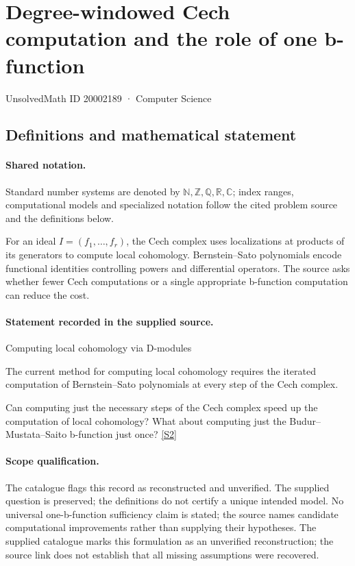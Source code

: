 \documentclass[11pt]{article}
\newcommand{\sref}[2]{\hyperlink{source:#1:#2}{[S#2]}}
\begin{document}
\setcounter{section}{20002188}
\section{Degree-windowed Cech computation and the role of one b-function}\label{20002189}
{\small\sffamily UnsolvedMath ID 20002189 · Computer Science}
\subsection{Definitions and mathematical statement}

\paragraph{Shared notation.}Standard number systems are denoted by $\mathbb N,\mathbb Z,\mathbb Q,\mathbb R,\mathbb C$; index ranges, computational models and specialized notation follow the cited problem source and the definitions below.


For an ideal $I=(f_1,\ldots,f_r)$, the Cech complex uses localizations at products of its generators to compute local cohomology. Bernstein--Sato polynomials encode functional identities controlling powers and differential operators. The source asks whether fewer Cech computations or a single appropriate b-function computation can reduce the cost.
\paragraph{Statement recorded in the supplied source.}
Computing local cohomology via D-modules

The current method for computing local cohomology requires the iterated computation of Bernstein--Sato polynomials at every step of the Cech complex.

Can computing just the necessary steps of the Cech complex speed up the computation of local cohomology? What about computing just the Budur--Mustata--Saito b-function just once? \sref{20002189}{2}
\paragraph{Scope qualification.}
The catalogue flags this record as reconstructed and unverified. The supplied question is preserved; the definitions do not certify a unique intended model. No universal one-b-function sufficiency claim is stated; the source names candidate computational improvements rather than supplying their hypotheses.
The supplied catalogue marks this formulation as an unverified reconstruction; the source link does not establish that all missing assumptions were recovered.
\end{document}
